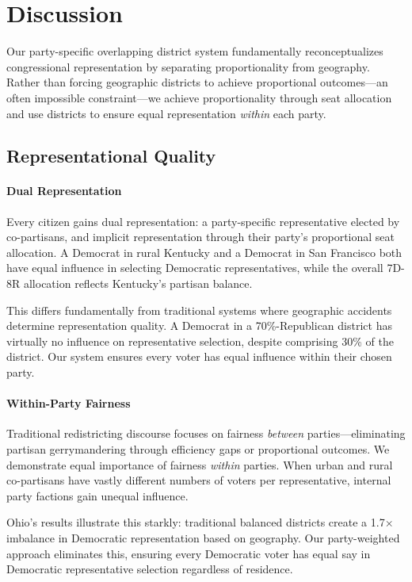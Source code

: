 
\section{Discussion}

Our party-specific overlapping district system fundamentally reconceptualizes congressional representation by separating proportionality from geography. Rather than forcing geographic districts to achieve proportional outcomes---an often impossible constraint---we achieve proportionality through seat allocation and use districts to ensure equal representation \emph{within} each party.

\subsection{Representational Quality}

\paragraph{Dual Representation}
Every citizen gains dual representation: a party-specific representative elected by co-partisans, and implicit representation through their party's proportional seat allocation. A Democrat in rural Kentucky and a Democrat in San Francisco both have equal influence in selecting Democratic representatives, while the overall 7D-8R allocation reflects Kentucky's partisan balance.

This differs fundamentally from traditional systems where geographic accidents determine representation quality. A Democrat in a 70\%-Republican district has virtually no influence on representative selection, despite comprising 30\% of the district. Our system ensures every voter has equal influence within their chosen party.

\paragraph{Within-Party Fairness}
Traditional redistricting discourse focuses on fairness \emph{between} parties---eliminating partisan gerrymandering through efficiency gaps or proportional outcomes. We demonstrate equal importance of fairness \emph{within} parties. When urban and rural co-partisans have vastly different numbers of voters per representative, internal party factions gain unequal influence.

Ohio's results illustrate this starkly: traditional balanced districts create a 1.7$\times$ imbalance in Democratic representation based on geography. Our party-weighted approach eliminates this, ensuring every Democratic voter has equal say in Democratic representative selection regardless of residence.

